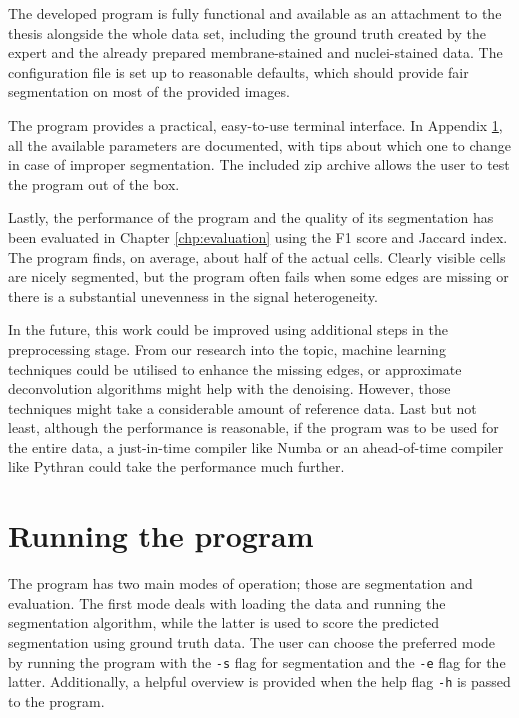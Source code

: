 \documentclass[
  digital,     %
  oneside,     %
  nosansbold,  %
  nocolorbold, %
  lof,         %
  lot,         %
]{fithesis4}
\begin{document}
The developed program is fully functional and available as an attachment to the
thesis alongside the whole data set, including the ground truth created by the
expert and the already prepared membrane-stained and nuclei-stained data. The
configuration file is set up to reasonable defaults, which should provide fair
segmentation on most of the provided images.

The program provides a practical, easy-to-use terminal interface. In Appendix
\ref{app:running-the-program}, all the available parameters are documented, with tips
about which one to change in case of improper segmentation. The included zip
archive allows the user to test the program out of the box.

Lastly, the performance of the program and the quality of its segmentation has
been evaluated in Chapter \ref{chp:evaluation} using the F1 score and Jaccard
index. The program finds, on average, about half of the actual cells. Clearly
visible cells are nicely segmented, but the program often fails when some edges
are missing or there is a substantial unevenness in the signal heterogeneity. 

In the future, this work could be improved using additional steps in the
preprocessing stage. From our research into the topic, machine learning
techniques could be utilised to enhance the missing edges, or approximate
deconvolution algorithms might help with the denoising. However, those
techniques might take a considerable amount of reference data. Last but not
least, although the performance is reasonable, if the program was to be used for
the entire data, a just-in-time compiler like Numba or an ahead-of-time compiler
like Pythran could take the performance much further.

\printbibliography[heading=bibintoc] %

\appendix %
\chapter{Running the program}
\label{app:running-the-program}
The program has two main modes of operation; those are segmentation and
evaluation. The first mode deals with loading the data and running the
segmentation algorithm, while the latter is used to score the predicted
segmentation using ground truth data. The user can choose the preferred
mode by running the program with the \texttt{-s} flag for segmentation and the
\texttt{-e} flag for the latter. Additionally, a helpful overview is
provided when the help flag \texttt{-h} is passed to the program.
\end{document}
